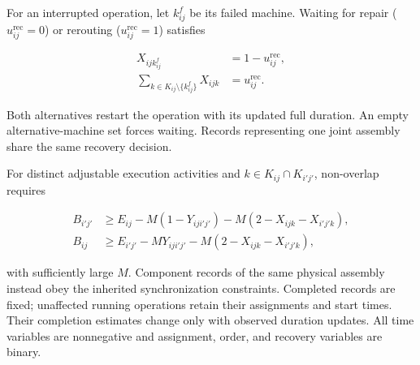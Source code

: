 For an interrupted operation, let $k^f_{ij}$ be its failed machine. Waiting for repair
($u^{\mathrm{rec}}_{ij}=0$) or rerouting ($u^{\mathrm{rec}}_{ij}=1$) satisfies


\begin{equation}
 \begin{aligned}
 X_{ij k^f_{ij}}&=1-u^{\mathrm{rec}}_{ij}, \\
 \sum_{k\in K_{ij}\setminus\{k^f_{ij}\}}X_{ijk}&=u^{\mathrm{rec}}_{ij}.
 \end{aligned}
 \label{eq:recovery_constraints}
\end{equation}


Both alternatives restart the operation with its updated full duration. An empty alternative-machine set forces waiting.
Records representing one joint assembly share the same recovery decision.



For distinct adjustable execution activities and $k\in K_{ij}\cap K_{i'j'}$, non-overlap requires


\begin{equation}
 \begin{aligned}
 B_{i'j'}&\ge E_{ij}-M(1-Y_{iji'j'})
 -M(2-X_{ijk}-X_{i'j'k}), \\
 B_{ij}&\ge E_{i'j'}-MY_{iji'j'}
 -M(2-X_{ijk}-X_{i'j'k}),
 \end{aligned}
 \label{eq:machine_capacity}
\end{equation}


with sufficiently large $M$. Component records of the same physical assembly instead obey the inherited
synchronization constraints. Completed records are fixed; unaffected running operations retain their assignments
and start times. Their completion estimates change only with observed duration updates.
All time variables are nonnegative and assignment, order, and recovery variables are binary.

